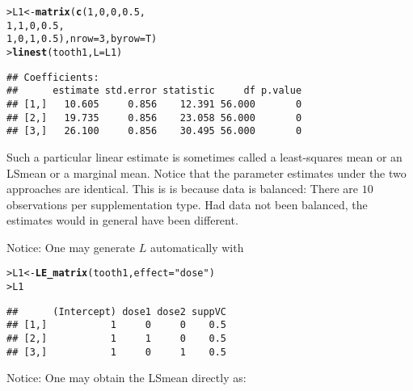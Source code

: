 \documentclass[11pt]{article}\usepackage[]{graphicx}\usepackage[]{color}
\makeatletter
\newcommand{\hlnum}[1]{\textcolor[rgb]{0.686,0.059,0.569}{#1}}%
\newcommand{\hlstr}[1]{\textcolor[rgb]{0.192,0.494,0.8}{#1}}%
\newcommand{\hlstd}[1]{\textcolor[rgb]{0.345,0.345,0.345}{#1}}%
\newcommand{\hlkwb}[1]{\textcolor[rgb]{0.69,0.353,0.396}{#1}}%
\newcommand{\hlkwc}[1]{\textcolor[rgb]{0.333,0.667,0.333}{#1}}%
\newcommand{\hlkwd}[1]{\textcolor[rgb]{0.737,0.353,0.396}{\textbf{#1}}}%
\newenvironment{kframe}{%
 \def\at@end@of@kframe{}%
 \ifinner\ifhmode%
  \def\at@end@of@kframe{\end{minipage}}%
  \begin{minipage}{\columnwidth}%
 \fi\fi%
 \def\FrameCommand##1{\hskip\@totalleftmargin \hskip-\fboxsep
 \colorbox{shadecolor}{##1}\hskip-\fboxsep
     \hskip-\linewidth \hskip-\@totalleftmargin \hskip\columnwidth}%
 \MakeFramed {\advance\hsize-\width
   \@totalleftmargin\z@ \linewidth\hsize
   \@setminipage}}%
 {\par\unskip\endMakeFramed%
 \at@end@of@kframe}
\newenvironment{knitrout}{}{} %
\renewenvironment{knitrout}{
  \begin{oldknitrout}
    \footnotesize
    \topsep=0pt
}{
  \end{oldknitrout}
}
\makeatother
\begin{document}
\begin{knitrout}
\color{fgcolor}\begin{kframe}
\begin{alltt}
\hlstd{> }\hlstd{L1} \hlkwb{<-} \hlkwd{matrix}\hlstd{(}\hlkwd{c}\hlstd{(}\hlnum{1}\hlstd{,} \hlnum{0}\hlstd{,} \hlnum{0}\hlstd{,} \hlnum{0.5}\hlstd{,}
\hlstd{  }               \hlnum{1}\hlstd{,} \hlnum{1}\hlstd{,} \hlnum{0}\hlstd{,} \hlnum{0.5}\hlstd{,}
\hlstd{  }               \hlnum{1}\hlstd{,} \hlnum{0}\hlstd{,} \hlnum{1}\hlstd{,} \hlnum{0.5}\hlstd{),} \hlkwc{nrow}\hlstd{=}\hlnum{3}\hlstd{,} \hlkwc{byrow}\hlstd{=T)}
\hlstd{> }\hlkwd{linest}\hlstd{(tooth1,} \hlkwc{L}\hlstd{=L1)}
\end{alltt}
\begin{verbatim}
## Coefficients:
##      estimate std.error statistic     df p.value
## [1,]   10.605     0.856    12.391 56.000       0
## [2,]   19.735     0.856    23.058 56.000       0
## [3,]   26.100     0.856    30.495 56.000       0
\end{verbatim}
\end{kframe}
\end{knitrout}

Such a particular linear estimate is sometimes called a least-squares
mean or an LSmean or a marginal mean. Notice that the parameter
estimates under the two approaches are identical. This is is because
data is balanced: There are $10$ observations per supplementation
type. Had data not been balanced, the estimates would in general have been different. 

Notice: One may generate $L$ automatically with
\begin{knitrout}
\color{fgcolor}\begin{kframe}
\begin{alltt}
\hlstd{> }\hlstd{L1} \hlkwb{<-} \hlkwd{LE_matrix}\hlstd{(tooth1,} \hlkwc{effect}\hlstd{=}\hlstr{"dose"}\hlstd{)}
\hlstd{> }\hlstd{L1}
\end{alltt}
\begin{verbatim}
##      (Intercept) dose1 dose2 suppVC
## [1,]           1     0     0    0.5
## [2,]           1     1     0    0.5
## [3,]           1     0     1    0.5
\end{verbatim}
\end{kframe}
\end{knitrout}

Notice: One may obtain the LSmean directly as:
\end{document}
